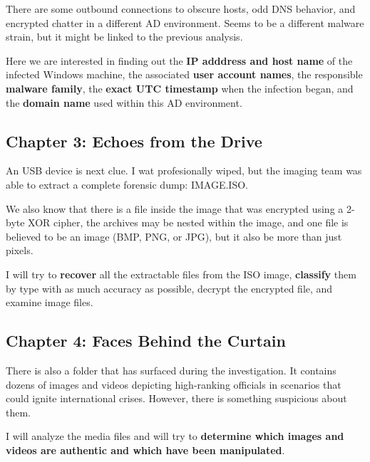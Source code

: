 \documentclass[pdflatex,sn-mathphys-num]{sn-jnl}
\begin{document}
\par There are some outbound connections to obscure hosts, odd DNS behavior, and encrypted chatter in a different AD
environment. Seems to be a different malware strain, but it might be linked to the previous analysis.

\par Here we are interested in finding out the \textbf{IP adddress and host name} of the infected Windows machine,
the associated \textbf{user account names}, the responsible \textbf{malware family}, the \textbf{exact UTC timestamp}
when the infection began, and the \textbf{domain name} used within this AD environment.

\subsection{Chapter 3: Echoes from the Drive}\label{chapter3_introduction}

\par An USB device is next clue. I wat profesionally wiped, but the imaging team was able to extract a complete forensic
dump: IMAGE.ISO\@.

\par We also know that there is a file inside the image that was encrypted using a 2-byte XOR cipher, the archives may
be nested within the image, and one file is believed to be an image (BMP, PNG, or JPG), but it also be more than just
pixels.

\par I will try to \textbf{recover} all the extractable files from the ISO image, \textbf{classify} them by type with
as much accuracy as possible, decrypt the encrypted file, and examine image files.

\subsection{Chapter 4: Faces Behind the Curtain}

\par There is also a folder that has surfaced during the investigation. It contains dozens of images and videos
depicting high-ranking officials in scenarios that could ignite international crises. However, there is something
suspicious about them.

\par I will analyze the media files and will try to \textbf{determine which images and videos are authentic and which
have been manipulated}.
\end{document}
